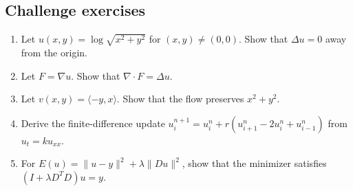 \documentclass[11pt]{article}
\newcommand{\grad}{\nabla}
\newcommand{\Div}{\nabla\!\cdot}
\newcommand{\Lap}{\Delta}
\begin{document}
\subsection*{Challenge exercises}
\begin{enumerate}[start=26]
  \item Let $u(x,y)=\log\sqrt{x^2+y^2}$ for $(x,y)\ne(0,0)$. Show that $\Lap u=0$ away from the origin.
  \item Let $F=\grad u$. Show that $\Div F=\Lap u$.
  \item Let $v(x,y)=\langle -y,x\rangle$. Show that the flow preserves $x^2+y^2$.
  \item Derive the finite-difference update $u_i^{n+1}=u_i^n+r(u_{i+1}^n-2u_i^n+u_{i-1}^n)$ from $u_t=ku_{xx}$.
  \item For $E(u)=\|u-y\|^2+\lambda\|Du\|^2$, show that the minimizer satisfies $(I+\lambda D^TD)u=y$.
\end{enumerate}
\end{document}
